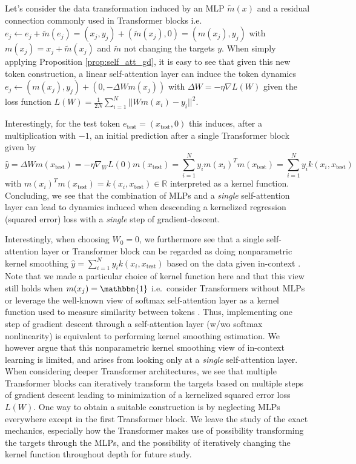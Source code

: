 \documentclass{article}
\theoremstyle{plain}
\theoremstyle{definition}
\theoremstyle{remark}
\begin{document}
Let's consider the data transformation induced by an MLP $\tilde{m}(x)$ and a residual connection commonly used in Transformer blocks i.e. $e_j \leftarrow e_j + \tilde{m}(e_j) = (x_j, y_j) + (\tilde{m}(x_j), 0) = (m(x_j), y_j)$ with $m(x_j) = x_j + \tilde{m}(x_j)$ and $\tilde{m}$ not changing the targets $y$. When simply applying Proposition \ref{prop:self_att_gd}, it is easy to see that given this new token construction, a linear self-attention layer can induce the token dynamics $e_j \leftarrow (m(x_j), y_j) + (0, -\Delta W m(x_j))$ with $\Delta W = -\eta \nabla L(W)$ given the loss function $L(W) = \frac{1}{2N}\sum_{i=1}^N||W m(x_i)  -y_i||^2$.

Interestingly, for the test token $e_{\text{test}} = (x_{\text{test}}, 0)$ this induces, after a multiplication with $-1$, an initial prediction after a single Transformer block given by
\begin{equation}
    \hat{y} = \Delta W m(x_{\text{test}}) = -\eta \nabla_W L(0) m(x_{\text{test}}) = \sum_{i=1}^N y_i m(x_i)^Tm(x_{\text{test}}) = \sum_{i=1}^N y_i k(x_i, x_{\text{test}})
\end{equation}
with $m(x_i)^Tm(x_{\text{test}})=k(x_i, x_{\text{test}}) \in\mathbb{R}$ interpreted as a kernel function.
Concluding, we see that the combination of MLPs and a \textit{single} self-attention layer can lead to dynamics induced when descending a kernelized regression (squared error) loss with a \textit{single} step of gradient-descent. 

Interestingly, when choosing $W_0=0$, we furthermore see that a single self-attention layer or Transformer block can be regarded as doing nonparametric kernel smoothing $\hat{y}=\sum_{i=1}^N y_i k(x_i, x_{\text{test}})$  based on the data given in-context \citep{nadaraya1964estimating,watson1964smooth}. Note that we made a particular choice of kernel function here and that this view still holds when $m(x_j)=\mathbbm{1}$ i.e.~consider Transformers without MLPs or leverage the well-known view of softmax self-attention layer as a kernel function used to measure similarity between tokens \citep[e.g.][]{choromanski2021rethinking,zhang2021dive}. 
Thus, implementing one step of gradient descent through a self-attention layer (w/wo softmax nonlinearity) is equivalent to performing kernel smoothing estimation. We however argue that this nonparametric kernel smoothing view of in-context learning is limited, and arises from looking only at a \textit{single} self-attention layer.
When considering deeper Transformer architectures, we see that multiple Transformer blocks can iteratively transform the targets based on multiple steps of gradient descent leading to minimization of a kernelized squared error loss $L(W)$. One way to obtain a suitable construction is by neglecting MLPs everywhere except in the first Transformer block. 
We leave the study of the exact mechanics, especially how the Transformer makes use of possibility transforming the targets through the MLPs, and the possibility of iteratively changing the kernel function throughout depth for future study.
\end{document}
